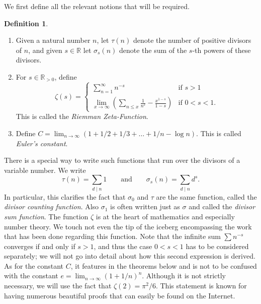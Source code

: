 \documentclass{article}
\theoremstyle{definition}
\newtheorem{definition}{Definition}
\newcommand\RR{\mathbb R}
\begin{document}

We first define all the relevant notions that will be required.

\begin{definition}
    \item
    \begin{enumerate}
        \item Given a natural number \(n\), let \(\tau(n)\) denote the number of positive divisors of \(n\), and given \(s\in\RR\) let \(\sigma_s(n)\) denote the sum of the \(s\)-th powers of these divisors.

        \item For \(s\in\RR_{>0}\), define
            \[
                \zeta(s) =
                \begin{cases}
                    \sum_{n=1}^{\infty} n^{-s} & \text{if } s > 1 \\
                    \lim_{x\to\infty} \left(\sum_{n\le x} \frac{1}{n^s} - \frac{x^{1-s}}{1-s}\right) & \text{if } 0 < s < 1.
                \end{cases}
            \]
            This is called the \textit{Riemman Zeta-Function}.

        \item Define \(C = \lim_{n\to\infty} (1 + 1/2 + 1/3 + \ldots + 1/n - \log n)\).
            This is called \textit{Euler's constant}.
    \end{enumerate}
\end{definition}

There is a special way to write such functions that run over the divisors of a variable number.
We write
\[\tau(n) = \sum_{d\mid n} 1 \qquad \text{and} \qquad \sigma_s(n) = \sum_{d\mid n} d^s.\]
In particular, this clarifies the fact that \(\sigma_0\) and \(\tau\) are the same function, called the \textit{divisor counting function}.
Also \(\sigma_1\) is often written just as \(\sigma\) and called the \textit{divisor sum function}.
The function \(\zeta\) is at the heart of mathematics and especially number theory.
We touch not even the tip of the iceberg encompassing the work that has been done regarding this function.
Note that the infinite sum \(\sum n^{-s}\) converges if and only if \(s>1\), and thus the case \(0<s<1\) has to be considered separately; we will not go into detail about how this second expression is derived.
As for the constant \(C\), it features in the theorems below and is not to be confused with the constant \(e = \lim_{n\to\infty} (1+1/n)^n\).
Although it is not strictly necessary, we will use the fact that \(\zeta(2) = \pi^2/6\).
This statement is known for having numerous beautiful proofs that can easily be found on the Internet.
\end{document}
